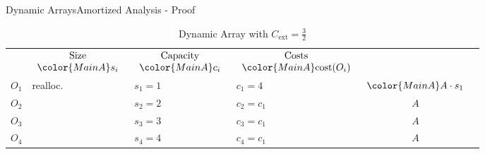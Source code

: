 
\begin{frame}{Dynamic Arrays}{Amortized Analysis - Proof}
  \vspace*{-1.0em}%
  \begin{table}[!h]%
    \caption{Dynamic Array with %
      $C_\text{ext} = \frac{3}{2}$}%
    \label{tab:amortized_analysis_limit}%
    \vspace*{-1.5em}%
    \begin{tabular}{|l|l|l|l|c|@{}l}
      \cmidrule[\heavyrulewidth]{1-5}\addlinespace[-\belowrulesep]
      \multicolumn{2}{|c|}{$\begin{array}{c}
          \text{Operation}\\
          \text{(append)}
        \end{array}$} &
      $\begin{array}{c}
        \text{Size}\\
        {\color{MainA}s_i}
      \end{array}$ &
      $\begin{array}{c}
        \text{Capacity}\\
        {\color{MainA}c_i}
      \end{array}$ &
      $\begin{array}{c}
        \text{Costs}\\
        {\color{MainA}\mathrm{cost}(O_i)}
      \end{array}$\\
      \addlinespace[-0.25\aboverulesep]\cmidrule[\heavyrulewidth]{1-5}
      $O_1$ & {\color{MainA}realloc.} &
      $s_1 = 1$ & {\color{MainA}$c_1 = 4$} &
      ${\color{MainA}A \cdot s_1}$ &
      \raisebox{-0.5em}{\multirow{4}{*}{%
        $\left.\begin{array}{@{}l@{}}\\[4.5em]\end{array}\right\rbrace
        \begin{array}{@{}l@{}}
           \text{distance}\\
           4 \geq \left\lfloor\dfrac{{\color{MainA}s_1}}{2}\right\rfloor
        \end{array}$%
      }}\\
      $O_2$ & {} & $s_2 = 2$ & $c_2 = c_1$ & $A$\\
      $O_3$ & {} & $s_3 = 3$ & $c_3 = c_1$ & $A$\\
      $O_4$ & {} & $s_4 = 4$ & $c_4 = c_1$ & $A$\\

\end{tabular}
\end{table}
\end{frame}

